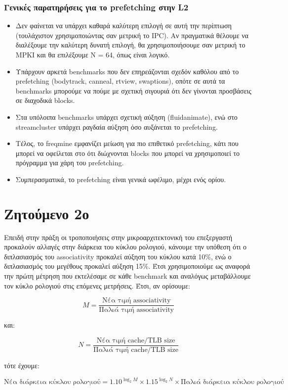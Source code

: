 \documentclass[12pt,a4paper]{article}
\begin{document}
			\subsubsection{Γενικές παρατηρήσεις για το prefetching στην L2}
				\begin{itemize}
					\item Δεν φαίνεται να υπάρχει καθαρά καλύτερη επιλογή σε αυτή την περίπτωση (τουλάχιστον χρησιμοποιώντας σαν μετρική το IPC). Αν πραγματικά θέλουμε να διαλέξουμε την καλύτερη δυνατή επιλογή, θα χρησιμοποιήσουμε σαν μετρική το MPKI και θα επιλέξουμε N = 64, όπως είναι λογικό.
					\item Υπάρχουν αρκετά benchmarks που δεν επηρεάζονται σχεδόν καθόλου από το prefetching (bodytrack, canneal, rtview, swaptions), οπότε σε αυτά τα benchmarks μπορούμε να πούμε με σχετική σιγουριά ότι δεν γίνονται προσβάσεις σε διαχοδικά blocks.
					\item Στα υπόλοιπα benchmarks υπάρχει σχετική αύξηση (fluidanimate), ενώ στο streamcluster υπάρχει ραγδαία αύξηση όσο αυξάνεται το prefetching.
					\item Τέλος, το freqmine εμφανίζει μείωση για πιο επιθετικό prefetching, κάτι που μπορεί να οφείλεται στο ότι διώχνονται blocks που μπορεί να χρησιμοποιεί το πρόγραμμα για χάρη του prefetching.
					\item Συμπερασματικά, το prefetching είναι γενικά ωφέλιμο, μέχρι ενός ορίου.
				\end{itemize}

	\section{Ζητούμενο 2ο}
		Επειδή στην πράξη οι τροποποιήσεις στην μικροαρχιτεκτονική του επεξεργαστή προκαλούν αλλαγές στην διάρκεια του κύκλου ρολογιού, κάνουμε την υπόθεση ότι ο διπλασιασμός του associativity προκαλεί αύξηση του κύκλου κατά 10\%, ενώ ο διπλασιασμός του μεγέθους προκαλεί αύξηση 15\%. Έτσι χρησιμοποιούμε ως αναφορά την πρώτη μέτρηση που εκτελέσαμε σε κάθε benchmark και αναλόγως μεταβάλλουμε τον κύκλο ρολογιού στις επόμενες μετρήσεις. Έτσι, αν ορίσουμε:
		
		\[
			M = \dfrac{\text{Νέα τιμή associativity}}{\text{Παλιά τιμή associativity}}
		\]
		
		και:
		
		\[
			N = \dfrac{\text{Νέα τιμή cache/TLB size}}{\text{Παλιά τιμή cache/TLB size}}
		\]
		
		τότε έχουμε:
		
		\[
			\text{Νέα διάρκεια κύκλου ρολογιού} = 1.10^{\log_2 M} \times 1.15^{\log_2 N} \times \text{Παλιά διάρκεια κύκλου ρολογιού}
		\]
		
\end{document}
